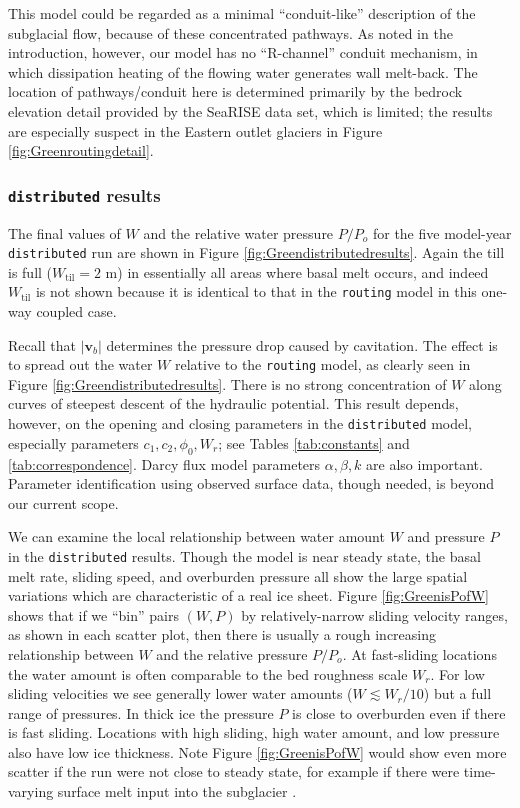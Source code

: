 \documentclass[gmd]{copernicus}   %
\newcommand{\text}{\textrm}
\newcommand\bv{\mathbf{v}}
\newcommand{\Wtil}{W_{\text{til}}}
\begin{document}
This model could be regarded as a minimal ``conduit-like'' description of the subglacial flow, because of these concentrated pathways.  As noted in the introduction, however, our model has no ``R-channel'' conduit mechanism, in which dissipation heating of the flowing water generates wall melt-back.  The location of pathways/conduit here is determined primarily by the bedrock elevation detail provided by the SeaRISE data set, which is limited; the results are especially suspect in the Eastern outlet glaciers in Figure \ref{fig:Greenroutingdetail}.

\subsubsection{\texttt{distributed} results}  The final values of $W$ and the relative water pressure $P/P_o$ for the five model-year \texttt{distributed} run are shown in Figure \ref{fig:Greendistributedresults}.  Again the till is full ($\Wtil=2$ m) in essentially all areas where basal melt occurs, and indeed $\Wtil$ is not shown because it is identical to that in the \texttt{routing} model in this one-way coupled case.

Recall that $|\bv_b|$ determines the pressure drop caused by cavitation.  The effect is to spread out the water $W$ relative to the \texttt{routing} model, as clearly seen in Figure \ref{fig:Greendistributedresults}.  There is no strong concentration of $W$ along curves of steepest descent of the hydraulic potential.  This result depends, however, on the opening and closing parameters in the \texttt{distributed} model, especially parameters $c_1,c_2,\phi_0,W_r$; see Tables \ref{tab:constants} and \ref{tab:correspondence}.  Darcy flux model parameters $\alpha,\beta,k$ are also important.  Parameter identification using observed surface data, though needed, is beyond our current scope.

We can examine the local relationship between water amount $W$ and pressure $P$ in the \texttt{distributed} results.  Though the model is near steady state, the basal melt rate, sliding speed, and overburden pressure all show the large spatial variations which are characteristic of a real ice sheet.  Figure \ref{fig:GreenisPofW} shows that if we ``bin'' pairs $(W,P)$ by relatively-narrow sliding velocity ranges, as shown in each scatter plot, then there is usually a rough increasing relationship between $W$ and the relative pressure $P/P_o$.  At fast-sliding locations the water amount is often comparable to the bed roughness scale $W_r$.  For low sliding velocities we see generally lower water amounts ($W \lesssim W_r/10$) but a full range of pressures.  In thick ice the pressure $P$ is close to overburden even if there is fast sliding.  Locations with high sliding, high water amount, and low pressure also have low ice thickness.  Note Figure \ref{fig:GreenisPofW} would show even more scatter if the run were not close to steady state, for example if there were time-varying surface melt input into the subglacier \citep{vanPeltthesis}.
\end{document}

